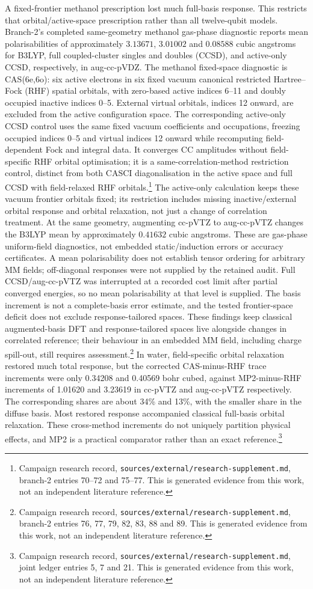 \documentclass{article}
\newcommand{\record}[1]{\footnote{Campaign research record, \texttt{sources/external/research-supplement.md}, #1. This is generated evidence from this work, not an independent literature reference.}}
\begin{document}
A fixed-frontier methanol prescription lost much full-basis response. This restricts that orbital/active-space prescription rather than all twelve-qubit models. Branch-2's completed same-geometry methanol gas-phase diagnostic reports mean polarisabilities of approximately \(3.13671\), \(3.01002\) and \(0.08588\) cubic angstroms for B3LYP, full coupled-cluster singles and doubles (CCSD), and active-only CCSD, respectively, in aug-cc-pVDZ. The methanol fixed-space diagnostic is CAS(6e,6o): six active electrons in six fixed vacuum canonical restricted Hartree--Fock (RHF) spatial orbitals, with zero-based active indices 6--11 and doubly occupied inactive indices 0--5. External virtual orbitals, indices 12 onward, are excluded from the active configuration space. The corresponding active-only CCSD control uses the same fixed vacuum coefficients and occupations, freezing occupied indices 0--5 and virtual indices 12 onward while recomputing field-dependent Fock and integral data. It converges CC amplitudes without field-specific RHF orbital optimisation; it is a same-correlation-method restriction control, distinct from both CASCI diagonalisation in the active space and full CCSD with field-relaxed RHF orbitals.\record{branch-2 entries 70--72 and 75--77} The active-only calculation keeps these vacuum frontier orbitals fixed; its restriction includes missing inactive/external orbital response and orbital relaxation, not just a change of correlation treatment. At the same geometry, augmenting cc-pVTZ to aug-cc-pVTZ changes the B3LYP mean by approximately \(0.41632\) cubic angstroms. These are gas-phase uniform-field diagnostics, not embedded static/induction errors or accuracy certificates. A mean polarisability does not establish tensor ordering for arbitrary MM fields; off-diagonal responses were not supplied by the retained audit. Full CCSD/aug-cc-pVTZ was interrupted at a recorded cost limit after partial converged energies, so no mean polarisability at that level is supplied. The basis increment is not a complete-basis error estimate, and the tested frontier-space deficit does not exclude response-tailored spaces. These findings keep classical augmented-basis DFT and response-tailored spaces live alongside changes in correlated reference; their behaviour in an embedded MM field, including charge spill-out, still requires assessment.\record{branch-2 entries 76, 77, 79, 82, 83, 88 and 89} In water, field-specific orbital relaxation restored much total response, but the corrected CAS-minus-RHF trace increments were only 0.34208 and 0.40569 bohr cubed, against MP2-minus-RHF increments of 1.01620 and 3.23619 in cc-pVTZ and aug-cc-pVTZ respectively. The corresponding shares are about 34\% and 13\%, with the smaller share in the diffuse basis. Most restored response accompanied classical full-basis orbital relaxation. These cross-method increments do not uniquely partition physical effects, and MP2 is a practical comparator rather than an exact reference.\record{joint ledger entries 5, 7 and 21}
\end{document}
